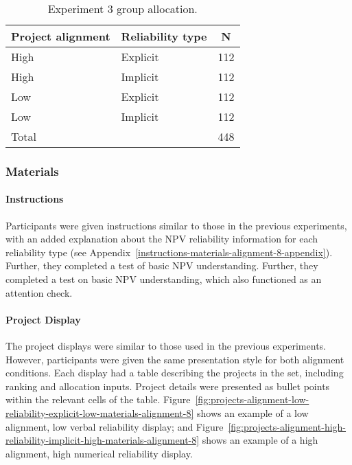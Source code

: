 \documentclass[a4paper, nobind]{templates/ociamthesis}
\theoremstyle{definition}
\theoremstyle{definition}
\theoremstyle{definition}
\theoremstyle{definition}
\theoremstyle{remark}
\begin{document}
\begin{table}[tbp]

\begin{center}
\begin{threeparttable}

\caption{\label{tab:condition-allocation-alignment-8}Experiment 3 group allocation.}

\begin{tabular}{lll}
\toprule
Project alignment & \multicolumn{1}{c}{Reliability type} & \multicolumn{1}{c}{N}\\
\midrule
High & Explicit & 112\\
High & Implicit & 112\\
Low & Explicit & 112\\
Low & Implicit & 112\\
Total &  & 448\\
\bottomrule
\end{tabular}

\end{threeparttable}
\end{center}

\end{table}

\subsubsection{Materials}

\paragraph{Instructions}

Participants were given instructions similar to those in the previous
experiments, with an added explanation about the NPV reliability information for
each reliability type (see
Appendix~\ref{instructions-materials-alignment-8-appendix}). Further, they
completed a test of basic NPV understanding. Further, they completed a test on
basic NPV understanding, which also functioned as an attention check.

\paragraph{Project Display}

The project displays were similar to those used in the previous experiments.
However, participants were given the same presentation style for both alignment
conditions. Each display had a table describing the projects in the set,
including ranking and allocation inputs. Project details were presented as
bullet points within the relevant cells of the table.
Figure~\ref{fig:projects-alignment-low-reliability-explicit-low-materials-alignment-8}
shows an example of a low alignment, low verbal reliability display; and
Figure~\ref{fig:projects-alignment-high-reliability-implicit-high-materials-alignment-8}
shows an example of a high alignment, high numerical reliability display.
\end{document}
